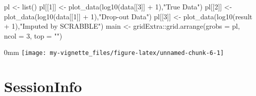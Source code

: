 \documentclass[]{article}
\newcommand{\hlnum}[1]{\textcolor[rgb]{0.816,0.125,0.439}{#1}}%
\newcommand{\hlstr}[1]{\textcolor[rgb]{0.251,0.627,0.251}{#1}}%
\newcommand{\hlopt}[1]{\textcolor[rgb]{0,0,0}{#1}}%
\newcommand{\hlstd}[1]{\textcolor[rgb]{0.251,0.251,0.251}{#1}}%
\newcommand{\hlkwc}[1]{\textcolor[rgb]{0.251,0.251,0.251}{#1}}%
\newcommand{\hlkwd}[1]{\textcolor[rgb]{0.878,0.439,0.125}{#1}}%
\newenvironment{Shaded}{\begin{myshaded}}{\end{myshaded}}
\newcommand{\KeywordTok}[1]{\hlkwd{#1}}
\newcommand{\DataTypeTok}[1]{\hlkwc{#1}}
\newcommand{\DecValTok}[1]{\hlnum{#1}}
\newcommand{\StringTok}[1]{\hlstr{#1}}
\newcommand{\OperatorTok}[1]{\hlopt{#1}}
\newcommand{\NormalTok}[1]{\hlstd{#1}}
\begin{document}
\begin{Shaded}
\begin{Highlighting}[]
\NormalTok{pl <-}\StringTok{ }\KeywordTok{list}\NormalTok{()}
\NormalTok{pl[[}\DecValTok{1}\NormalTok{]] <-}\StringTok{ }\KeywordTok{plot_data}\NormalTok{(}\KeywordTok{log10}\NormalTok{(data[[}\DecValTok{3}\NormalTok{]] }\OperatorTok{+}\StringTok{ }\DecValTok{1}\NormalTok{),}\StringTok{"True Data"}\NormalTok{)}
\NormalTok{pl[[}\DecValTok{2}\NormalTok{]] <-}\StringTok{ }\KeywordTok{plot_data}\NormalTok{(}\KeywordTok{log10}\NormalTok{(data[[}\DecValTok{1}\NormalTok{]] }\OperatorTok{+}\StringTok{ }\DecValTok{1}\NormalTok{),}\StringTok{"Drop-out Data"}\NormalTok{)}
\NormalTok{pl[[}\DecValTok{3}\NormalTok{]] <-}\StringTok{ }\KeywordTok{plot_data}\NormalTok{(}\KeywordTok{log10}\NormalTok{(result }\OperatorTok{+}\StringTok{ }\DecValTok{1}\NormalTok{),}\StringTok{"Imputed by SCRABBLE"}\NormalTok{)}
\NormalTok{main <-}\StringTok{ }\NormalTok{gridExtra}\OperatorTok{::}\KeywordTok{grid.arrange}\NormalTok{(}\DataTypeTok{grobs =}\NormalTok{ pl, }\DataTypeTok{ncol =} \DecValTok{3}\NormalTok{, }\DataTypeTok{top =} \StringTok{""}\NormalTok{)}
\end{Highlighting}
\end{Shaded}

\begin{adjustwidth}{\fltoffset}{0mm}
\texttt{[image: my-vignette\_files/figure-latex/unnamed-chunk-6-1]} \end{adjustwidth}

\section{SessionInfo}\label{sessioninfo}
\end{document}
